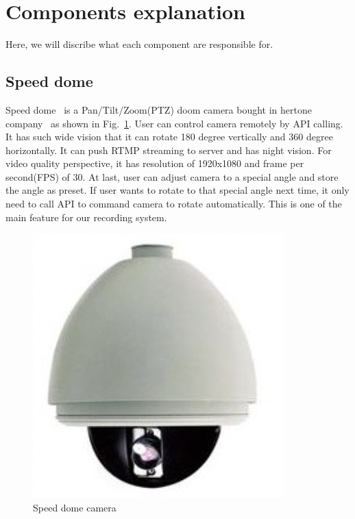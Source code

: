 \section{Components explanation}
Here, we will discribe what each component are responsible for.
\subsection{Speed dome}
Speed dome~\cite{speed-dome} is a Pan/Tilt/Zoom(PTZ) doom camera bought in hertone company~\cite{hertone-LTD} as shown in Fig.~\ref{fig:speeddome}. User can control camera remotely by API calling. It has such wide vision that it can rotate 180 degree vertically and 360 degree horizontally. It can push RTMP streaming to server and has night vision. For video quality perspective, it has resolution of 1920x1080 and frame per second(FPS) of 30. At last, user can adjust camera to a special angle and store the angle as preset. If user wants to rotate to that special angle next time, it only need to call API to command camera to rotate automatically. This is one of the main feature for our recording system.
\begin{figure}[H]
    \centering
    \includegraphics[width=\textwidth / 3]{figsrc/speeddome.png}
    \caption{Speed dome camera\label{fig:speeddome}}
\end{figure}

